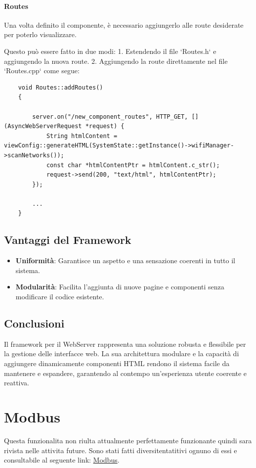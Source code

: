 \documentclass[12pt,a4paper]{report}
\begin{document}
\paragraph{Routes }
Una volta definito il componente, è necessario aggiungerlo alle route desiderate per poterlo visualizzare.

Questo può essere fatto in due modi:
1. Estendendo il file `Routes.h` e aggiungendo la nuova route.
2. Aggiungendo la route direttamente nel file `Routes.cpp` come segue:

\begin{verbatim}
    void Routes::addRoutes()
    {
        
        server.on("/new_component_routes", HTTP_GET, [](AsyncWebServerRequest *request) {
            String htmlContent = viewConfig::generateHTML(SystemState::getInstance()->wifiManager->scanNetworks());
            const char *htmlContentPtr = htmlContent.c_str();
            request->send(200, "text/html", htmlContentPtr);
        });
    
        ...
    }
\end{verbatim}

\subsection{Vantaggi del Framework}
\begin{itemize}
    \item \textbf{Uniformità}: Garantisce un aspetto e una sensazione coerenti in tutto il sistema.
    \item \textbf{Modularità}: Facilita l'aggiunta di nuove pagine e componenti senza modificare il codice esistente.
\end{itemize}

\subsection{Conclusioni}
Il framework per il WebServer rappresenta una soluzione robusta e flessibile per la gestione delle interfacce web. La sua architettura modulare e la capacità di aggiungere dinamicamente componenti HTML rendono il sistema facile da mantenere e espandere, garantendo al contempo un'esperienza utente coerente e reattiva.

\section{Modbus}
Questa funzionalita non riulta attualmente perfettamente funzionante quindi sara rivista nelle attivita future.
Sono stati fatti diversitentatitivi ognuno di essi e consultabile al seguente link: \href{../src/SLAVE_EXAMPLE/}{Modbus}.
\end{document}
